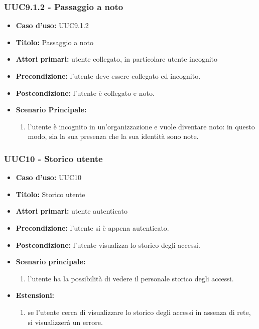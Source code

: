 \documentclass[casi-duso]{subfiles}
\begin{document}
\subsubsection{UUC9.1.2 - Passaggio a noto}
\label{subsub:UUC9.1.2utente}
\begin{itemize}
  \item \textbf{Caso d’uso:} UUC9.1.2
  \item \textbf{Titolo:} Passaggio a noto
  \item \textbf{Attori primari:} utente collegato, in particolare utente incognito
  \item \textbf{Precondizione:} l'utente deve essere collegato ed incognito.
  \item \textbf{Postcondizione:} l'utente è collegato e noto.
  \item \textbf{Scenario Principale:}
  \begin{enumerate}
    \item l'utente è incognito in un'organizzazione e vuole diventare noto: in questo modo, sia la sua presenza che la sua identità sono note.
  \end{enumerate}
\end{itemize}

\subsubsection{UUC10 - Storico utente}
\label{subsub:UUC10utente}
\begin{itemize}
  \item \textbf{Caso d’uso:} UUC10
  \item \textbf{Titolo:} Storico utente
  \item \textbf{Attori primari:} utente autenticato
  \item \textbf{Precondizione:}  l'utente si è appena autenticato.
  \item \textbf{Postcondizione:} l'utente visualizza lo storico degli accessi.
  \item \textbf{Scenario principale:} 
  \begin{enumerate}
    \item l'utente ha la possibilità di vedere il personale storico degli accessi.
  \end{enumerate}  
  \item \textbf{Estensioni:} 
  \begin{enumerate}
    \item se l'utente cerca di visualizzare lo storico degli accessi in assenza di rete, si visualizzerà un errore.
  \end{enumerate}  
\end{itemize}
\end{document}
